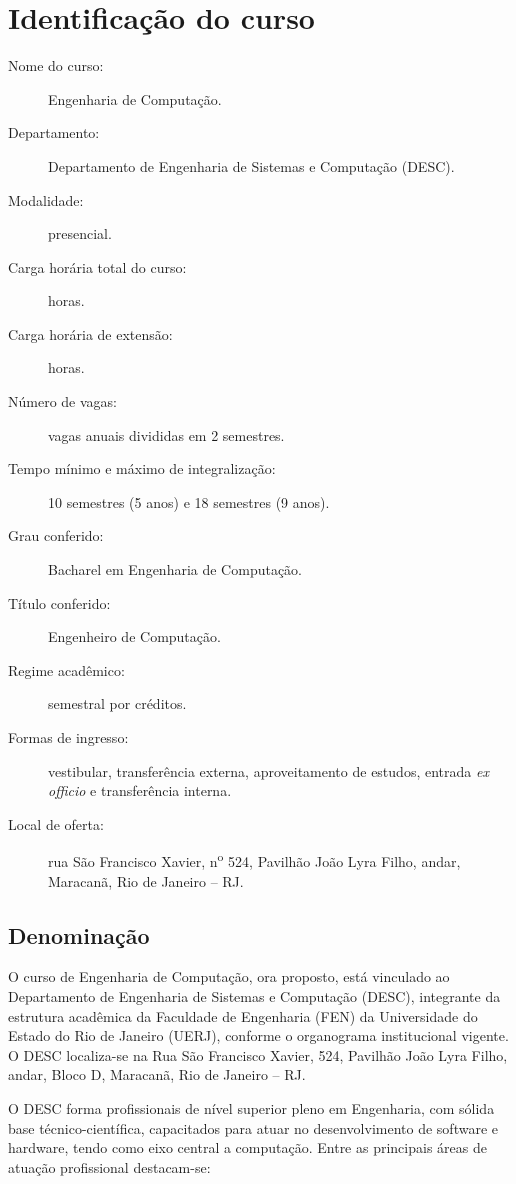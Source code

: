 \chapter{Identificação do curso}
\thispagestyle{plain}

\begin{description}
  \item [Nome do curso:] Engenharia de Computação.
  \item [Departamento:] Departamento de Engenharia de Sistemas e Computação (DESC).
  \item [Modalidade:] presencial.
  \item [Carga horária total do curso:] \tHorasCurso horas.
  \item [Carga horária de extensão:] \hExtensao horas.
  \item [Número de vagas:] \vagas vagas anuais divididas em 2 semestres.
  \item [Tempo mínimo e máximo de integralização:] 10 semestres (5 anos) e 18 semestres (9 anos).
  \item [Grau conferido:] Bacharel em Engenharia de Computação.
  \item [Título conferido:] Engenheiro de Computação.
  \item [Regime acadêmico:] semestral por créditos.
  \item [Formas de ingresso:] vestibular, transferência externa, aproveitamento de estudos, entrada \textit{ex officio} e transferência interna.
  \item [Local de oferta:] rua São Francisco Xavier, n\textsuperscript{o} 524, Pavilhão João Lyra Filho,  andar, Maracanã, Rio de Janeiro – RJ.
\end{description}
\section{Denominação}

O curso de Engenharia de Computação, ora proposto, está vinculado ao Departamento de Engenharia de Sistemas e Computação (DESC), integrante da estrutura acadêmica da Faculdade de Engenharia (FEN) da Universidade do Estado do Rio de Janeiro (UERJ), conforme o organograma institucional vigente. O DESC localiza-se na Rua São Francisco Xavier,  524, Pavilhão João Lyra Filho,  andar, Bloco D, Maracanã, Rio de Janeiro – RJ.

O DESC forma profissionais de nível superior pleno em Engenharia, com sólida base técnico-científica, capacitados para atuar no desenvolvimento de software e hardware, tendo como eixo central a computação. Entre as principais áreas de atuação profissional destacam-se:

